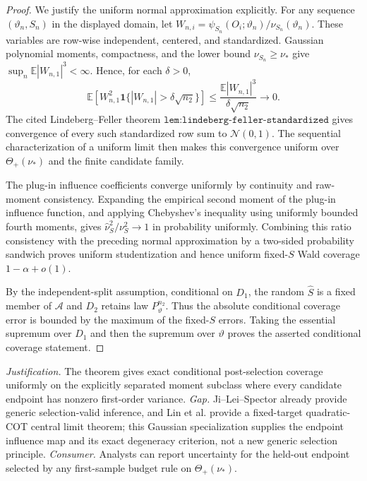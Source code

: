 \documentclass{article}
\begin{document}
\begin{proof}
We justify the uniform normal approximation explicitly.  For any sequence
\((\vartheta_n,S_n)\) in the displayed domain, let
\(W_{n,i}=\psi_{S_n}(O_i;\vartheta_n)/\nu_{S_n}(\vartheta_n)\).  These variables are row-wise independent, centered, and standardized.  Gaussian polynomial moments, compactness, and the lower bound \(\nu_{S_n}\geq\nu_*\) give
\(\sup_n\mathbb E|W_{n,1}|^3<\infty\).  Hence, for each \(\delta>0\),
\[
 \mathbb E\!\left[W_{n,1}^2\mathbf1\{|W_{n,1}|>\delta\sqrt{n_2}\}\right]
 \leq\frac{\mathbb E|W_{n,1}|^3}{\delta\sqrt{n_2}}\longrightarrow0.
\]
The cited Lindeberg--Feller theorem \(\texttt{lem:lindeberg-feller-standardized}\) gives convergence of every such standardized row sum to \(\mathcal N(0,1)\).  The sequential characterization of a uniform limit then makes this convergence uniform over \(\Theta_+(\nu_*)\) and the finite candidate family.

The plug-in influence coefficients converge uniformly by continuity and raw-moment consistency.  Expanding the empirical second moment of the plug-in influence function, and applying Chebyshev's inequality using uniformly bounded fourth moments, gives
\(\widehat\nu_S^2/\nu_S^2\to1\) in probability uniformly.  Combining this ratio consistency with the preceding normal approximation by a two-sided probability sandwich proves uniform studentization and hence uniform fixed-\(S\) Wald coverage \(1-\alpha+o(1)\).

By the independent-split assumption, conditional on \(D_1\), the random \(\widehat S\) is a fixed member of \(\mathcal A\) and \(D_2\) retains law \(P_\vartheta^{n_2}\).  Thus the absolute conditional coverage error is bounded by the maximum of the fixed-\(S\) errors.  Taking the essential supremum over \(D_1\) and then the supremum over \(\vartheta\) proves the asserted conditional coverage statement.
\end{proof}
\par\smallskip\noindent \textit{Justification.} The theorem gives exact conditional post-selection coverage uniformly on the explicitly separated moment subclass where every candidate endpoint has nonzero first-order variance. \textit{Gap.} Ji--Lei--Spector already provide generic selection-valid inference, and Lin et al. provide a fixed-target quadratic-COT central limit theorem; this Gaussian specialization supplies the endpoint influence map and its exact degeneracy criterion, not a new generic selection principle. \textit{Consumer.} Analysts can report uncertainty for the held-out endpoint selected by any first-sample budget rule on \(\Theta_+(\nu_*)\).
\end{document}
